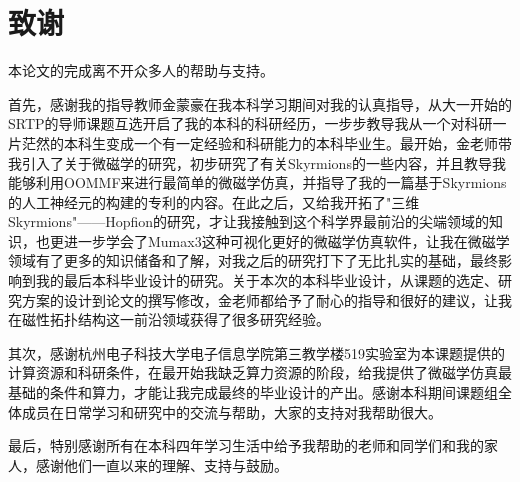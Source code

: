 \documentclass{article}
\begin{document}
\chapter*{致\hspace{1em}谢}

本论文的完成离不开众多人的帮助与支持。

首先，感谢我的指导教师金蒙豪在我本科学习期间对我的认真指导，从大一开始的SRTP的导师课题互选开启了我的本科的科研经历，一步步教导我从一个对科研一片茫然的本科生变成一个有一定经验和科研能力的本科毕业生。最开始，金老师带我引入了关于微磁学的研究，初步研究了有关Skyrmions的一些内容，并且教导我能够利用OOMMF来进行最简单的微磁学仿真，并指导了我的一篇基于Skyrmions的人工神经元的构建的专利的内容。在此之后，又给我开拓了"三维Skyrmions"——Hopfion的研究，才让我接触到这个科学界最前沿的尖端领域的知识，也更进一步学会了Mumax3这种可视化更好的微磁学仿真软件，让我在微磁学领域有了更多的知识储备和了解，对我之后的研究打下了无比扎实的基础，最终影响到我的最后本科毕业设计的研究。关于本次的本科毕业设计，从课题的选定、研究方案的设计到论文的撰写修改，金老师都给予了耐心的指导和很好的建议，让我在磁性拓扑结构这一前沿领域获得了很多研究经验。

其次，感谢杭州电子科技大学电子信息学院第三教学楼519实验室为本课题提供的计算资源和科研条件，在最开始我缺乏算力资源的阶段，给我提供了微磁学仿真最基础的条件和算力，才能让我完成最终的毕业设计的产出。感谢本科期间课题组全体成员在日常学习和研究中的交流与帮助，大家的支持对我帮助很大。

最后，特别感谢所有在本科四年学习生活中给予我帮助的老师和同学们和我的家人，感谢他们一直以来的理解、支持与鼓励。


\end{document}
